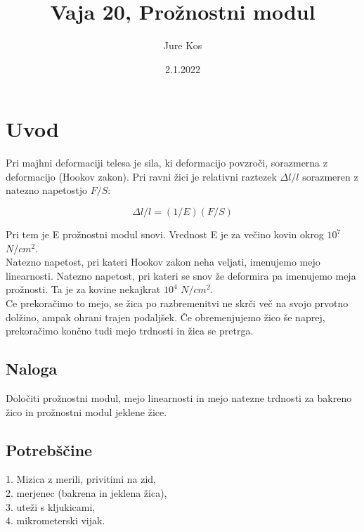 \documentclass[a4paper]{report}
\author{Jure Kos}
\title{Vaja 20, Prožnostni modul}
\date{2.1.2022}
\begin{document}
\maketitle

\chapter*{Uvod}
Pri majhni deformaciji telesa je sila, ki deformacijo povzroči, sorazmerna z deformacijo (Hookov zakon). Pri ravni žici je relativni raztezek $\Delta l/l$ sorazmeren z natezno napetostjo $F/S$:

\[\Delta l/l = (1/E)(F/S)\]

Pri tem je E prožnostni modul snovi. Vrednost E je za večino kovin okrog $10^7$ $N/cm^2$.\\
Natezno napetost, pri kateri Hookov zakon neha veljati, imenujemo mejo linearnosti. Natezno napetost, pri kateri se snov že deformira pa imenujemo meja prožnosti. Ta je za kovine nekajkrat $10^4$ $N/cm^2$.\\ Ce prekoračimo to mejo, se žica po razbremenitvi ne skrči več na svojo prvotno dolžino, ampak ohrani trajen podaljšek. Če obremenjujemo žico še naprej, prekoračimo končno tudi mejo trdnosti in žica se pretrga.

\section{Naloga}
Določiti prožnostni modul, mejo linearnosti in mejo natezne trdnosti za bakreno žico in prožnostni modul jeklene žice.

\section{Potrebščine}
1. Mizica z merili, privitimi na zid,\\
2. merjenec (bakrena in jeklena žica),\\
3. uteži s kljukicami,\\
4. mikrometerski vijak.
\end{document}
